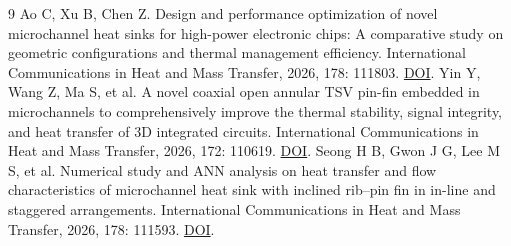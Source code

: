 \documentclass[stage1,fontset=fandol]{ydzjreport}
\begin{document}
\begin{thebibliography}{9}
 Ao C, Xu B, Chen Z. Design and performance optimization of novel microchannel heat sinks for high-power electronic chips: A comparative study on geometric configurations and thermal management efficiency. International Communications in Heat and Mass Transfer, 2026, 178: 111803. \href{https://doi.org/10.1016/j.icheatmasstransfer.2026.111803}{DOI}.
 Yin Y, Wang Z, Ma S, et al. A novel coaxial open annular TSV pin-fin embedded in microchannels to comprehensively improve the thermal stability, signal integrity, and heat transfer of 3D integrated circuits. International Communications in Heat and Mass Transfer, 2026, 172: 110619. \href{https://doi.org/10.1016/j.icheatmasstransfer.2026.110619}{DOI}.
 Seong H B, Gwon J G, Lee M S, et al. Numerical study and ANN analysis on heat transfer and flow characteristics of microchannel heat sink with inclined rib--pin fin in in-line and staggered arrangements. International Communications in Heat and Mass Transfer, 2026, 178: 111593. \href{https://doi.org/10.1016/j.icheatmasstransfer.2026.111593}{DOI}.
\end{thebibliography}
\end{document}

